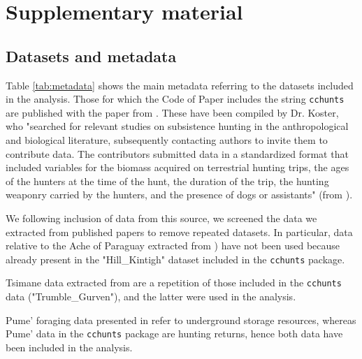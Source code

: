 \section{Supplementary material}
\subsection{Datasets and metadata}
Table \ref{tab:metadata} shows the main metadata referring to the datasets included in the analysis. Those for which the Code of Paper includes the string \texttt{cchunts} are published with the paper from \cite{koster_life_2020}. These have been compiled by Dr. Koster, who "searched for relevant studies on subsistence hunting in the anthropological and biological literature, subsequently contacting authors to invite them to contribute data. The contributors submitted data in a standardized format that included variables for the biomass acquired on terrestrial hunting trips, the ages of the hunters at the time of the hunt, the duration of the trip, the hunting weaponry carried by the hunters, and the presence of dogs or assistants" (from \cite{koster_life_2020}).

We following inclusion of data from this source, we screened the data we extracted from published papers to remove repeated datasets. In particular, data relative to the Ache of Paraguay extracted from \cite{walker_age-dependency_2002}) have not been used because already present in the "Hill\_Kintigh" dataset included in the \texttt{cchunts} package. 

Tsimane data extracted from \cite{gurven_how_2006} are a repetition of those included in the \texttt{cchunts} data ("Trumble\_Gurven"), and the latter were used in the analysis.

Pume' foraging data presented in \cite{kramer_early_2009} refer to underground storage resources, whereas Pume' data in the \texttt{cchunts} package are hunting returns, hence both data have been included in the analysis.

